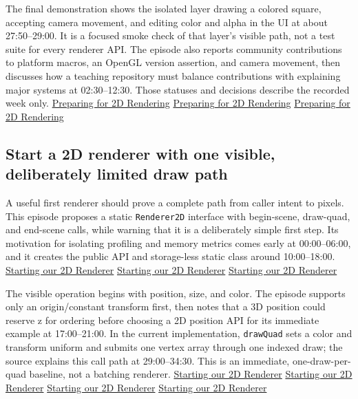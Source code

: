 The final demonstration shows the isolated layer drawing a colored square, accepting camera movement, and editing color and alpha in the UI at about 27:50--29:00. It is a focused smoke check of that layer's visible path, not a test suite for every renderer API. The episode also reports community contributions to platform macros, an OpenGL version assertion, and camera movement, then discusses how a teaching repository must balance contributions with explaining major systems at 02:30--12:30. Those statuses and decisions describe the recorded week only. \href{https://www.youtube.com/watch?v=sEiZZ2APlDs&t=1670s}{Preparing for 2D Rendering} \href{https://www.youtube.com/watch?v=sEiZZ2APlDs&t=150s}{Preparing for 2D Rendering} \href{https://www.youtube.com/watch?v=sEiZZ2APlDs&t=600s}{Preparing for 2D Rendering}

\subsection{Start a 2D renderer with one visible, deliberately limited draw path}\label{06-engine-ii-ch025-start-a-2d-renderer-with-one-visible-deliberately-limited-draw-path}

A useful first renderer should prove a complete path from caller intent to pixels. This episode proposes a static \texttt{Renderer2D} interface with begin-scene, draw-quad, and end-scene calls, while warning that it is a deliberately simple first step. Its motivation for isolating profiling and memory metrics comes early at 00:00--06:00, and it creates the public API and storage-less static class around 10:00--18:00. \href{https://www.youtube.com/watch?v=r_5fF1AxgpU&t=0s}{Starting our 2D Renderer} \href{https://www.youtube.com/watch?v=r_5fF1AxgpU&t=360s}{Starting our 2D Renderer} \href{https://www.youtube.com/watch?v=r_5fF1AxgpU&t=600s}{Starting our 2D Renderer}

The visible operation begins with position, size, and color. The episode supports only an origin/constant transform first, then notes that a 3D position could reserve z for ordering before choosing a 2D position API for its immediate example at 17:00--21:00. In the current implementation, \texttt{drawQuad} sets a color and transform uniform and submits one vertex array through one indexed draw; the source explains this call path at 29:00--34:30. This is an immediate, one-draw-per-quad baseline, not a batching renderer. \href{https://www.youtube.com/watch?v=r_5fF1AxgpU&t=1020s}{Starting our 2D Renderer} \href{https://www.youtube.com/watch?v=r_5fF1AxgpU&t=1260s}{Starting our 2D Renderer} \href{https://www.youtube.com/watch?v=r_5fF1AxgpU&t=1740s}{Starting our 2D Renderer} \href{https://www.youtube.com/watch?v=r_5fF1AxgpU&t=2040s}{Starting our 2D Renderer}

